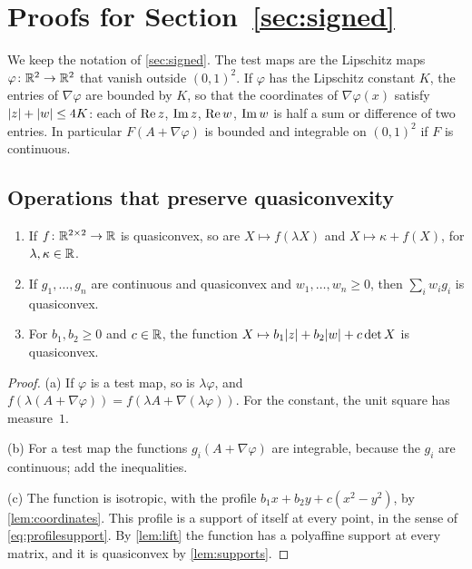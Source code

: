 \section{Proofs for Section~\ref{sec:signed}}\label{app:signed}

We keep the notation of \cref{sec:signed}. The test maps are the Lipschitz maps
$\varphi\colon\mathbb{R}^2\to\mathbb{R}^2$ that vanish outside $(0,1)^2$. If $\varphi$ has the Lipschitz constant
$K$, the entries of $\nabla\varphi$ are bounded by $K$, so that the coordinates of
$\nabla\varphi(x)$ satisfy $\lvert z\rvert+\lvert w\rvert\le4K$: each of $\operatorname{Re} z$, $\operatorname{Im} z$, $\operatorname{Re} w$, $\operatorname{Im} w$ is
half a sum or difference of two entries. In particular $F(A+\nabla\varphi)$ is bounded and
integrable on $(0,1)^2$ if $F$ is continuous.

\subsection{Operations that preserve quasiconvexity}

\begin{lemma}\label{lem:qc-operations}
\begin{enumerate}[label=\textup{(\alph*)}]
\item If $f\colon\mathbb{R}^{2\times 2}\to\mathbb{R}$ is quasiconvex, so are $X\mapsto f(\lambda X)$ and
  $X\mapsto\kappa+f(X)$, for $\lambda,\kappa\in\mathbb{R}$.
\item If $g_1,\dots,g_n$ are continuous and quasiconvex and $w_1,\dots,w_n\ge0$, then
  $\sum_iw_ig_i$ is quasiconvex.
\item For $b_1,b_2\ge0$ and $c\in\mathbb{R}$, the function $X\mapsto b_1\lvert z\rvert+b_2\lvert w\rvert+c\det X$ is
  quasiconvex.
\end{enumerate}
\end{lemma}

\begin{proof}
(a) If $\varphi$ is a test map, so is $\lambda\varphi$, and
$f(\lambda(A+\nabla\varphi))=f(\lambda A+\nabla(\lambda\varphi))$. For the constant, the unit
square has measure~$1$.

(b) For a test map the functions $g_i(A+\nabla\varphi)$ are integrable, because the $g_i$ are
continuous; add the inequalities.

(c) The function is isotropic, with the profile $b_1x+b_2y+c(x^2-y^2)$, by
\cref{lem:coordinates}. This profile is a support of itself at every point, in the sense of
\eqref{eq:profilesupport}. By \cref{lem:lift} the function has a polyaffine support at every
matrix, and it is quasiconvex by \cref{lem:supports}.
\end{proof}

